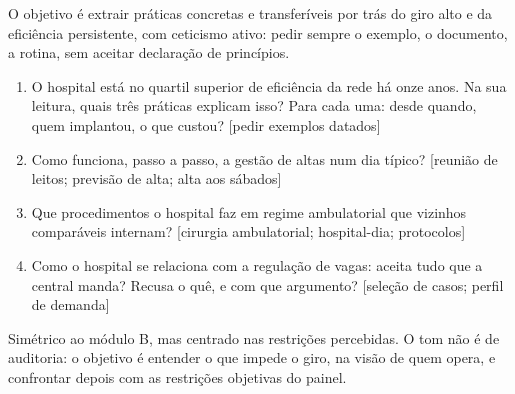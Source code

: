 
O objetivo é extrair práticas concretas e transferíveis por trás do giro
alto e da eficiência persistente, com ceticismo ativo: pedir sempre o
exemplo, o documento, a rotina, sem aceitar declaração de princípios.

\begin{enumerate}[itemsep=2pt]
  \item O hospital está no quartil superior de eficiência da rede há onze anos. Na sua leitura, quais três práticas explicam isso? Para cada uma: desde quando, quem implantou, o que custou? [pedir exemplos datados]
  \par\nopagebreak{}
  \item Como funciona, passo a passo, a gestão de altas num dia típico? [reunião de leitos; previsão de alta; alta aos sábados]
  \par\nopagebreak{}
  \item Que procedimentos o hospital faz em regime ambulatorial que vizinhos comparáveis internam? [cirurgia ambulatorial; hospital-dia; protocolos]
  \par\nopagebreak{}
  \item Como o hospital se relaciona com a regulação de vagas: aceita tudo que a central manda? Recusa o quê, e com que argumento? [seleção de casos; perfil de demanda]
  \par\nopagebreak{}
\end{enumerate}


Simétrico ao módulo B, mas centrado nas restrições percebidas. O tom não
é de auditoria: o objetivo é entender o que impede o giro, na visão de
quem opera, e confrontar depois com as restrições objetivas do painel.

